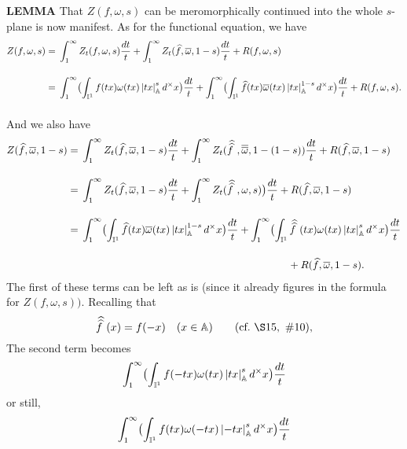 \begin{x}{\small\bf LEMMA}
That $Z(f,\omega,s)  $ can be meromorphically continued into the whole $s$-plane is now manifest.  
As for the functional equation, we have
\\
\begin{align*}
Z(f,\omega,s)      
&= \vsx \int_1^\infty Z_t(f,\omega,s) \frac{dt}{t} 
+ \int_1^\infty Z_t(\widehat{f},\ov{\omega},1-s)  \frac{dt}{t} 
+ R(f,\omega,s)  \\
&= \vsx\int_1^\infty \bigl(\int_{\I^1} f(tx) \omega(tx) \abs{tx}_\A^s d^\times x\bigr)  \frac{dt}{t} 
+ \int_1^\infty \bigl(\int_{\I^1} \widehat{f}(tx) \ov{\omega}(tx) \abs{tx}_\A^{1-s} d^\times x\bigr)  \frac{dt}{t} 
+ R(f,\omega,s).
\end{align*}
And we also have
\\
\begin{align*}
Z(\widehat{f},\ov{\omega},1-s)      	
&=\vsx \int_1^\infty Z_t(\widehat{f},\ov{\omega},1-s) \frac{dt}{t} + \int_1^\infty Z_t(\widehat{\widehat{f}\hspace{0.125cm}},\ov{\ov{\omega}},1-(1-s))  \frac{dt}{t} + R(\widehat{f},\ov{\omega},1-s)  \\
&=\vsx \int_1^\infty Z_t(\widehat{f},\ov{\omega},1-s) \frac{dt}{t} 
+ \int_1^\infty Z_t(\widehat{\widehat{f}\hspace{0.125cm}},\omega,s)\bigr)  \frac{dt}{t} 
+ R(\widehat{f},\ov{\omega},1-s)  \\						
&=\vsx \int_1^\infty \bigl(\int_{\I^1} \widehat{f}(tx) \ov{\omega}(tx) \abs{tx}_\A^{1-s} d^\times x\bigr)  \frac{dt}{t} 
+ \int_1^\infty \bigl(\int_{\I^1} \widehat{\widehat{f}\hspace{0.125cm}}(tx) \omega(tx) \abs{tx}_\A^s d^\times x\bigr)  \frac{dt}{t} \\
&\hspace{7.5cm} +  R(\widehat{f},\ov{\omega},1-s).
\end{align*}
The first of these terms can be left as is (since it already figures in the formula for $Z(f,\omega,s)).$  
Recalling that
\[
\widehat{\widehat{f}\hspace{0.125cm}}(x) = f(-x) \quad (x \in \A) \qquad (\text{cf.} \  \S15, \ \#10),
\]
The second term becomes
\[
\int_1^\infty \bigl(\int_{\mathbb{I}^1} f(-tx) \omega(tx) \left\vert tx\right\vert_{\mathbb{A}}^s d^\times x\bigr) \frac{dt}{t}
\]
or still,
\[
\int_1^\infty \bigl(\int_{\mathbb{I}^1} f(tx) \omega(-tx) \left\vert-tx\right\vert_{\mathbb{A}}^s d^\times x\bigr) \frac{dt}{t} 
\]
\end{x}
